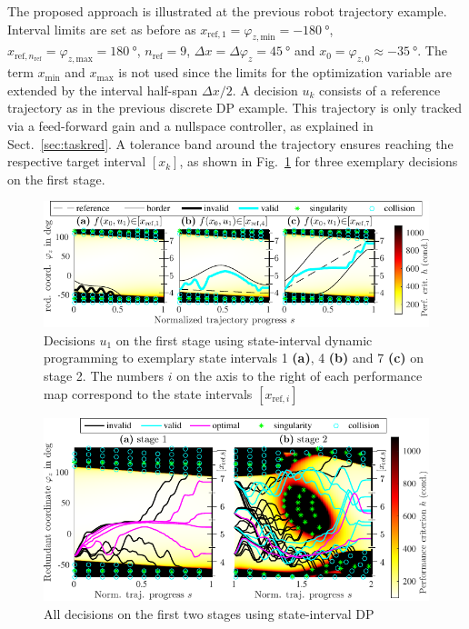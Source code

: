 \documentclass[runningheads]{llncs}
\begin{document}
The proposed approach is illustrated at the previous robot trajectory example.
Interval limits are set as before as 
$x_{\mathrm{ref},1}=\varphi_{z,\mathrm{min}}=\SI{-180}{\degree}$, $x_{\mathrm{ref},n_{\mathrm{ref}}}=\varphi_{z,\mathrm{max}}=\SI{180}{\degree}$,  $n_{\mathrm{ref}
}=9$, $\Delta x = \Delta \varphi_{z} = \SI{45}{\degree}$ and  $x_0=\varphi_{z,0}\approx\SI{-35}{\degree}$.
The term $x_{\mathrm{min}}$ and $x_{\mathrm{max}}$ is not used since the limits for the optimization variable are extended by the interval half-span $\Delta x / 2$.
A decision $u_k$ consists of a reference trajectory as in the previous discrete DP example.
This trajectory is only tracked via a feed-forward gain and a nullspace controller, as explained in Sect.~\ref{sec:taskred}.
A tolerance band around the trajectory ensures reaching the respective target interval $[x_k]$, as shown in Fig.~\ref{fig:idp_example_stage1} for three exemplary decisions on the first stage.

\begin{figure}[ptb]
\centering
\includegraphics{dp_interv_stage1_3cases_compressed.pdf}
\caption{Decisions $u_1$ on the first stage using state-interval dynamic programming to exemplary state intervals 1 \textbf{(a)}, 4 \textbf{(b)} and 7 \textbf{(c)} on stage 2. The numbers $i$ on the axis to the right of each performance map correspond to the state intervals $[x_{\mathrm{ref},i}]$ }
\label{fig:idp_example_stage1}
\end{figure}

\begin{figure}[ptb]
\centering
\includegraphics{dp_interv_stage1_to_2_compressed.pdf}
\caption{All decisions on the first two stages using state-interval DP}
\label{fig:idp_example_stage12}
\end{figure}
\end{document}
